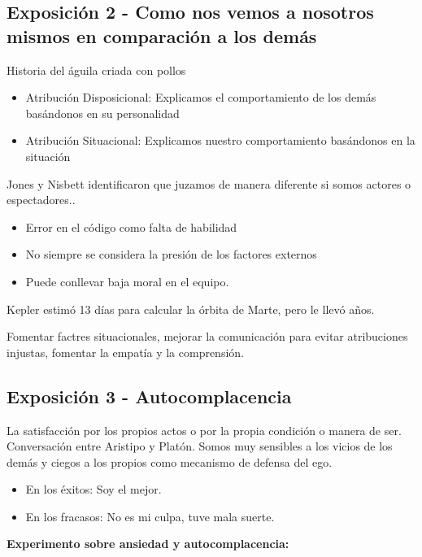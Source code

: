 \documentclass[12pt, a4paper, twoside]{article}
\begin{document}
\subsection{Exposición 2 - Como nos vemos a nosotros mismos en comparación a los demás}
Historia del águila criada con pollos
\begin{itemize}
    \item{Atribución Disposicional: Explicamos el comportamiento de los demás basándonos en su personalidad}
    \item {Atribución Situacional: Explicamos nuestro comportamiento basándonos en la situación}
\end{itemize}
Jones  y Nisbett identificaron que juzamos de manera diferente si somos actores o espectadores..

\begin{itemize}
    \item{Error en el código como falta de habilidad}
    \item{No siempre se considera la presión de los factores externos}
    \item {Puede conllevar baja moral en el equipo.}
\end{itemize}

Kepler estimó 13 días para calcular la órbita de Marte, pero le llevó años.\newline

Fomentar factres situacionales, mejorar la comunicación para evitar atribuciones injustas,
fomentar la empatía y la comprensión.\\

\subsection{Exposición 3 - Autocomplacencia}

La satisfacción por los propios actos o por la propia condición o manera de ser.\newline
Conversación entre Aristipo y Platón.\newline
Somos muy sensibles a los vicios de los demás y ciegos a los propios como mecanismo
de defensa del ego. \newline
\begin{itemize}
    \item{En los éxitos: Soy el mejor.}
    \item{En los fracasos: No es mi culpa, tuve mala suerte.}
\end{itemize}
\textbf{Experimento sobre ansiedad y autocomplacencia:} 
\end{document}
